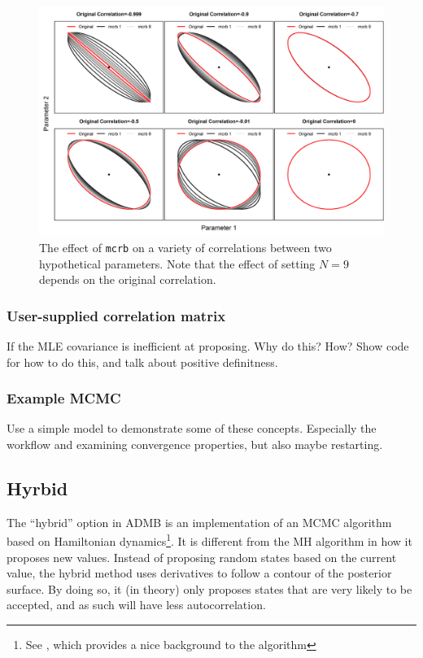 \documentclass{article}\usepackage[]{graphicx}\usepackage[]{color}
\begin{document}
\begin{figure}[h]
  \centering
  \includegraphics[width=5in]{../plots/mcrb_examples.png}
  \caption{The effect of \texttt{mcrb} on a variety of
    correlations between two hypothetical parameters. Note
    that the effect of setting $N=9$ depends on the original
    correlation.}
  \label{fig:mcrb}
\end{figure}
\subsubsection{User-supplied correlation matrix}
If the MLE covariance is inefficient at proposing. Why do this?
How? Show code for how to do this, and talk about positive
definitness.
\subsubsection{Example MCMC}
Use a simple model to demonstrate some of these
concepts. Especially the workflow and examining convergence
properties, but also maybe restarting.

\subsection{Hyrbid}\label{sec:hybrid}
The ``hybrid'' option in ADMB is an implementation of an MCMC algorithm
based on Hamiltonian dynamics\footnote{See \cite{brooks2011}, which
  provides a nice background to the algorithm}. It is different from the MH
algorithm in how it proposes new values. Instead of proposing random states
based on the current value, the hybrid method uses derivatives to follow a
contour of the posterior surface. By doing so, it (in theory) only proposes
states that are very likely to be accepted, and as such will have less
autocorrelation.
\end{document}
